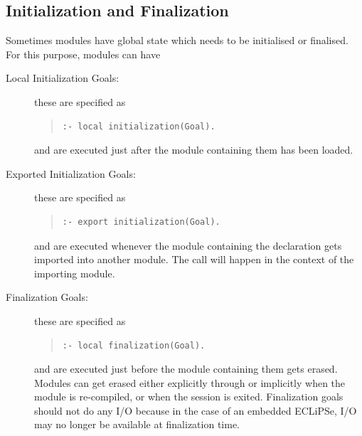 \subsection{Initialization and Finalization}
\label{initfini}
Sometimes modules have global state which needs to be initialised
or finalised. For this purpose, modules can have
\begin{description}
\item[Local Initialization Goals:]
these are specified as
\begin{quote}\begin{verbatim}
:- local initialization(Goal).
\end{verbatim}\end{quote}
and are executed just after the module containing them has been loaded.
\item[Exported Initialization Goals:]
these are specified as
\begin{quote}\begin{verbatim}
:- export initialization(Goal).
\end{verbatim}\end{quote}
and are executed whenever the module containing the declaration gets
imported into another module. The call will happen in the context of
the importing module.
\item[Finalization Goals:]
these are specified as
\begin{quote}\begin{verbatim}
:- local finalization(Goal).
\end{verbatim}\end{quote}
and are executed just before the module containing them gets erased.
Modules can get erased either explicitly through
or implicitly when the module is re-compiled, or when the {\eclipse}
session is exited.  Finalization goals should not do any I/O because
in the case of an embedded ECLiPSe, I/O may no longer be available at
finalization time.

\end{description}

